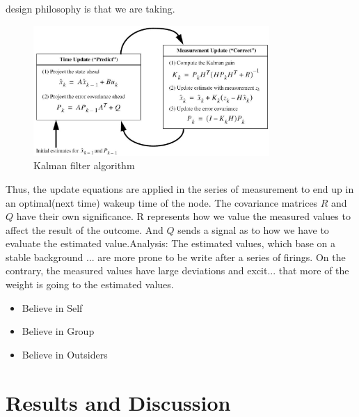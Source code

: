 \documentclass[a4paper,8pt]{report}
\begin{document}
design philosophy is that we are taking. \newline
\begin{figure}
\centering
\includegraphics[width=0.8\textwidth]{kalman_update}
\caption{Kalman filter algorithm}
\end{figure}
Thus, the update equations are applied in the series of measurement
to end up in an optimal(next time) wakeup time of the node.\newline
The covariance matrices $R$ and $Q$ have their own significance. R
represents how we value the measured values to affect the result of
the outcome. And $Q$ sends a signal as to how we have to evaluate
the estimated value.\newline Analysis: The estimated values, which
base on a stable background ... are more prone to be write after a
series of firings. On the contrary, the measured values have large
deviations and excit... that more of the weight is going to the
estimated values.\begin{itemize}
\item Believe in Self
\item Believe in Group
\item Believe in Outsiders
\end{itemize}
\newpage
\chapter{Results and Discussion}
\end{document}
